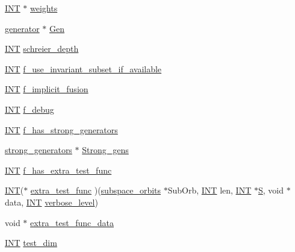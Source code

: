 \begin{DoxyCompactItemize}
\item 
\mbox{\hyperlink{galois_8h_a09fddde158a3a20bd2dcadb609de11dc}{I\+NT}} $\ast$ \mbox{\hyperlink{classsubspace__orbits_a4022b3078b346c376be07a41dace3ae9}{weights}}
\item 
\mbox{\hyperlink{classgenerator}{generator}} $\ast$ \mbox{\hyperlink{classsubspace__orbits_ad36f3c4b79988b75567f243ac9b8beb3}{Gen}}
\item 
\mbox{\hyperlink{galois_8h_a09fddde158a3a20bd2dcadb609de11dc}{I\+NT}} \mbox{\hyperlink{classsubspace__orbits_ab2de892b251e3d98cfc18cd3a3aff713}{schreier\+\_\+depth}}
\item 
\mbox{\hyperlink{galois_8h_a09fddde158a3a20bd2dcadb609de11dc}{I\+NT}} \mbox{\hyperlink{classsubspace__orbits_ae523dcf404b2b5730c67c832e999d2df}{f\+\_\+use\+\_\+invariant\+\_\+subset\+\_\+if\+\_\+available}}
\item 
\mbox{\hyperlink{galois_8h_a09fddde158a3a20bd2dcadb609de11dc}{I\+NT}} \mbox{\hyperlink{classsubspace__orbits_a8a1968bac13ccd7a104ee0ad19143c5a}{f\+\_\+implicit\+\_\+fusion}}
\item 
\mbox{\hyperlink{galois_8h_a09fddde158a3a20bd2dcadb609de11dc}{I\+NT}} \mbox{\hyperlink{classsubspace__orbits_a143eb24ed00a6038b11ebd4c1b7e611e}{f\+\_\+debug}}
\item 
\mbox{\hyperlink{galois_8h_a09fddde158a3a20bd2dcadb609de11dc}{I\+NT}} \mbox{\hyperlink{classsubspace__orbits_af8263faabf94b08316eb19a2d54bd052}{f\+\_\+has\+\_\+strong\+\_\+generators}}
\item 
\mbox{\hyperlink{classstrong__generators}{strong\+\_\+generators}} $\ast$ \mbox{\hyperlink{classsubspace__orbits_ac50cd2979cfb5cdbfc0b3c1fc751609f}{Strong\+\_\+gens}}
\item 
\mbox{\hyperlink{galois_8h_a09fddde158a3a20bd2dcadb609de11dc}{I\+NT}} \mbox{\hyperlink{classsubspace__orbits_abf6cf38b70e72928d3d8cd12b92bc806}{f\+\_\+has\+\_\+extra\+\_\+test\+\_\+func}}
\item 
\mbox{\hyperlink{galois_8h_a09fddde158a3a20bd2dcadb609de11dc}{I\+NT}}($\ast$ \mbox{\hyperlink{classsubspace__orbits_ad8a14be0379de2f5b2ac5e652a460dd8}{extra\+\_\+test\+\_\+func}} )(\mbox{\hyperlink{classsubspace__orbits}{subspace\+\_\+orbits}} $\ast$Sub\+Orb, \mbox{\hyperlink{galois_8h_a09fddde158a3a20bd2dcadb609de11dc}{I\+NT}} len, \mbox{\hyperlink{galois_8h_a09fddde158a3a20bd2dcadb609de11dc}{I\+NT}} $\ast$\mbox{\hyperlink{simeon_8_c_adab47f8243f1b5a2c31df2535d6b37d0}{S}}, void $\ast$data, \mbox{\hyperlink{galois_8h_a09fddde158a3a20bd2dcadb609de11dc}{I\+NT}} \mbox{\hyperlink{simeon_8_c_a818073fbcc2f439e7c56952f67386122}{verbose\+\_\+level}})
\item 
void $\ast$ \mbox{\hyperlink{classsubspace__orbits_a8a125bc042a277c38af19df5346ca5ff}{extra\+\_\+test\+\_\+func\+\_\+data}}
\item 
\mbox{\hyperlink{galois_8h_a09fddde158a3a20bd2dcadb609de11dc}{I\+NT}} \mbox{\hyperlink{classsubspace__orbits_a66889e8a616ee713381dc9b7c0676b3e}{test\+\_\+dim}}
\end{DoxyCompactItemize}


